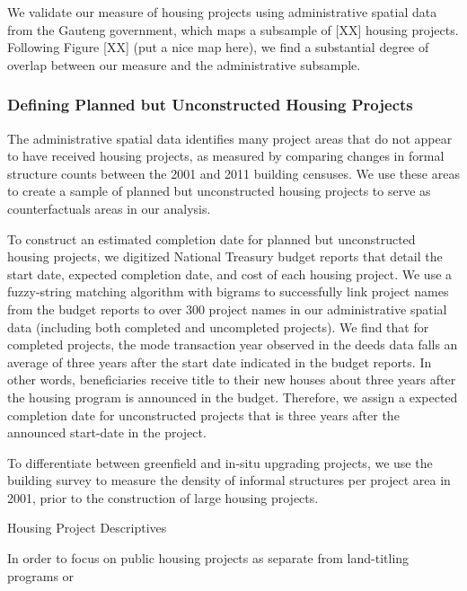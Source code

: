 \documentclass[12pt]{article}
\begin{document}
We validate our measure of housing projects using administrative spatial data from the Gauteng government, which maps a subsample of [XX] housing projects.  Following Figure [XX] (put a nice map here), we find a substantial degree of overlap between our measure and the administrative subsample.  

\subsubsection{Defining Planned but Unconstructed Housing Projects}

The administrative spatial data identifies many project areas that do not appear to have received housing projects, as measured by comparing changes in formal structure counts between the 2001 and 2011 building censuses.  We use these areas to create a sample of planned but unconstructed housing projects to serve as counterfactuals areas in our analysis.

To construct an estimated completion date for planned but unconstructed housing projects, we digitized National Treasury budget reports that detail the start date, expected completion date, and cost of each housing project.  We use a fuzzy-string matching algorithm with bigrams to successfully link project names from the budget reports to over 300 project names in our administrative spatial data (including both completed and uncompleted projects).  We find that for completed projects, the mode transaction year observed in the deeds data falls an average of three years after the start date indicated in the budget reports.  In other words, beneficiaries receive title to their new houses about three years after the housing program is announced in the budget.  Therefore, we assign a expected completion date for unconstructed projects that is three years after the announced start-date in the project.

To differentiate between greenfield and in-situ upgrading projects, we use the building survey to measure the density of informal structures per project area in 2001, prior to the construction of large housing projects.


\begin{table}
	\centering
	\caption{Housing Project Descriptives}\label{table:projectdescriptives}

\end{table}

In order to focus on public housing projects as separate from land-titling programs or 
\end{document}
